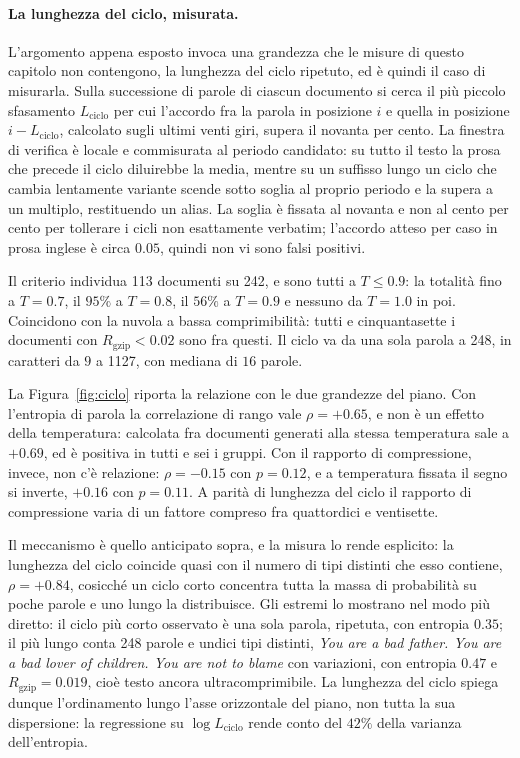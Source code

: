 \paragraph{La lunghezza del ciclo, misurata.}
L'argomento appena esposto invoca una grandezza che le misure di questo capitolo
non contengono, la lunghezza del ciclo ripetuto, ed è quindi il caso di
misurarla. Sulla successione di parole di ciascun documento si cerca il più
piccolo sfasamento $L_{\mathrm{ciclo}}$ per cui l'accordo fra la parola in
posizione $i$ e quella in posizione $i - L_{\mathrm{ciclo}}$, calcolato sugli
ultimi venti giri, supera il novanta per cento. La finestra di verifica è locale
e commisurata al periodo candidato: su tutto il testo la prosa che precede il
ciclo diluirebbe la media, mentre su un suffisso lungo un ciclo che cambia
lentamente variante scende sotto soglia al proprio periodo e la supera a un
multiplo, restituendo un alias. La soglia è fissata al novanta e non al cento
per cento per tollerare i cicli non esattamente verbatim; l'accordo atteso per
caso in prosa inglese è circa $0.05$, quindi non vi sono falsi positivi.

Il criterio individua \num{113} documenti su \num{242}, e sono tutti a
$T \le 0.9$: la totalità fino a $T = 0.7$, il $95\%$ a $T = 0.8$, il $56\%$ a
$T = 0.9$ e nessuno da
$T = 1.0$ in poi. Coincidono con la nuvola a bassa comprimibilità: tutti e
cinquantasette i documenti con $R_{\mathrm{gzip}} < 0.02$ sono fra questi. Il
ciclo va da una sola parola a \num{248}, in caratteri da $9$ a \num{1127}, con
mediana di $16$ parole.

La Figura~\ref{fig:ciclo} riporta la relazione con le due grandezze del piano.
Con l'entropia di parola la correlazione di rango vale $\rho = +0.65$, e non è
un effetto della temperatura: calcolata fra documenti generati alla stessa
temperatura sale a $+0.69$, ed è positiva in tutti e sei i gruppi. Con il
rapporto di compressione, invece, non c'è relazione: $\rho = -0.15$ con
$p = 0.12$, e a temperatura fissata il segno si inverte, $+0.16$ con
$p = 0.11$. A parità di lunghezza del ciclo il rapporto di compressione varia di
un fattore compreso fra quattordici e ventisette.

Il meccanismo è quello anticipato sopra, e la misura lo rende esplicito: la
lunghezza del ciclo coincide quasi con il numero di tipi distinti che esso
contiene, $\rho = +0.84$, cosicché un ciclo corto concentra tutta la massa di
probabilità su poche parole e uno lungo la distribuisce. Gli estremi lo
mostrano nel modo più diretto: il ciclo più corto osservato è una sola parola,
ripetuta, con entropia $0.35$; il più lungo conta \num{248} parole e undici
tipi distinti, \emph{You are a bad father. You are a bad lover of children.
You are not to blame} con variazioni, con entropia $0.47$ e $R_{\mathrm{gzip}}
= 0.019$, cioè testo ancora ultracomprimibile. La lunghezza del ciclo spiega
dunque l'ordinamento lungo l'asse orizzontale del piano, non tutta la sua
dispersione: la regressione su $\log L_{\mathrm{ciclo}}$ rende conto del
$42\%$ della varianza dell'entropia.


